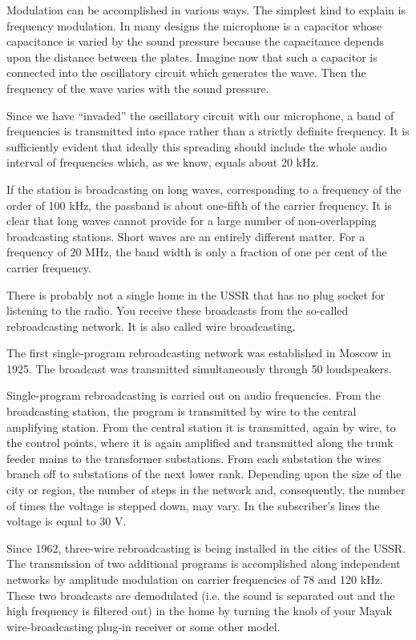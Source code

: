 Modulation can be accomplished in various ways. The simplest kind to explain is frequency modulation. In many designs the microphone is a capacitor whose capacitance is varied by the sound pressure because the capacitance depends upon the distance between the plates. Imagine now that such a capacitor is connected into the oscillatory circuit which generates the wave. Then the frequency of the wave varies with the sound pressure.

Since we have ``invaded'' the oscillatory circuit with our microphone, a band of frequencies is transmitted into space rather than a strictly definite frequency. It is sufficiently evident that ideally this spreading should include the whole audio interval of frequencies which, as we know, equals about 20 kHz.

If the station is broadcasting on long waves, corresponding to a frequency of the order of 100 kHz, the passband is about one-fifth of the carrier frequency. It is clear that long waves cannot provide for a large number of non-overlapping broadcasting stations. Short waves are an entirely different matter. For a frequency of 20 MHz, the band width is only a fraction of one per cent of the carrier frequency.

There is probably not a single home in the USSR that has no plug socket for listening to the radio. You receive these broadcasts from the so-called rebroadcasting network. It is also called wire broadcasting.

The first single-program rebroadcasting network was established in Moscow in 1925. The broadcast was transmitted simultaneously through 50 loudspeakers.


Single-program rebroadcasting is carried out on audio frequencies. From the broadcasting station, the program is transmitted by wire to the central amplifying station. From the central station it is transmitted, again by wire, to the control points, where it is again amplified and transmitted along the trunk feeder mains to the transformer substations. From each substation the wires branch off to substations of the next lower rank. Depending upon the size of the city or region, the number of steps in the network and, consequently, the number of times the voltage is stepped down, may vary. In the subscriber's lines the voltage is equal to 30 V.

Since 1962, three-wire rebroadcasting is being installed in the cities of the USSR. The transmission of two additional programs is accomplished along independent networks by amplitude modulation on carrier frequencies of 78 and 120 kHz. These two broadcasts are demodulated (i.e. the sound is separated out and the high frequency is filtered out) in the home by turning the knob of your Mayak wire-broadcasting plug-in receiver or some other model.

